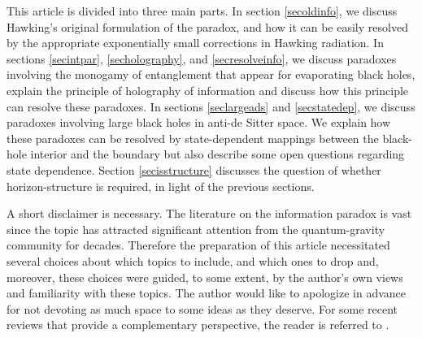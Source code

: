 \documentclass[12pt]{article}
\begin{document}
This article is divided into three main parts. In section \ref{secoldinfo}, we discuss Hawking's original formulation of the paradox, and how it can be easily resolved by the appropriate exponentially small corrections in Hawking radiation. In sections \ref{secintpar}, \ref{secholography}, and \ref{secresolveinfo}, we discuss paradoxes involving the monogamy of entanglement that appear for evaporating black holes, explain the principle of holography of information  and discuss how this principle  can resolve these paradoxes. In sections \ref{seclargeads} and \ref{secstatedep}, we discuss paradoxes involving large black holes in anti-de Sitter space. We explain how these paradoxes can be resolved by state-dependent mappings between the black-hole interior and the boundary but also describe some open questions regarding state dependence. Section \ref{secisstructure} discusses the question of whether horizon-structure is required, in light of the previous sections.

A short disclaimer is necessary. The literature on the information paradox is vast since the topic has attracted significant attention from the quantum-gravity community for decades. Therefore the preparation of this  article necessitated several choices about which topics to include, and which ones to drop and, moreover, these choices were guided, to some extent, by the author's own views and familiarity with these topics.  The author would like to apologize in advance for not devoting as much space to some ideas as they deserve. For some recent reviews that provide a complementary perspective, the reader is referred to \cite{Harlow:2014yka,Chakraborty:2017pmn,Perez:2017cmj}.
\end{document}
